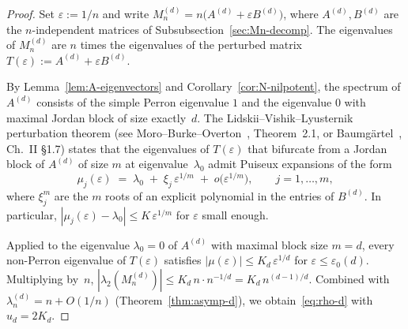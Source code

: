 \documentclass{amsart}
\theoremstyle{definition}
\theoremstyle{remark}
\begin{document}
\begin{proof}
Set $\varepsilon := 1/n$ and write
$M_n^{(d)} = n\bigl(A^{(d)} + \varepsilon B^{(d)}\bigr)$, where
$A^{(d)}, B^{(d)}$ are the $n$-independent matrices of
Subsubsection~\ref{sec:Mn-decomp}.  The eigenvalues of $M_n^{(d)}$ are
$n$ times the eigenvalues of the perturbed matrix
$T(\varepsilon) := A^{(d)} + \varepsilon B^{(d)}$.

By Lemma~\ref{lem:A-eigenvectors} and
Corollary~\ref{cor:N-nilpotent}, the spectrum of $A^{(d)}$
consists of the simple Perron eigenvalue $1$ and the eigenvalue
$0$ with maximal Jordan block of size exactly~$d$.  The
Lidskii--Vishik--Lyusternik perturbation theorem
(see Moro--Burke--Overton~\cite{moro-burke-overton-1997},
Theorem~2.1, or Baumg\"artel~\cite{baumgartel}, Ch.~II
\S 1.7) states that the eigenvalues of $T(\varepsilon)$ that
bifurcate from a Jordan block of $A^{(d)}$ of size $m$ at
eigenvalue~$\lambda_0$ admit Puiseux expansions of the form
\[
  \mu_j(\varepsilon) \;=\; \lambda_0 \;+\; \xi_j\,
    \varepsilon^{1/m} \;+\; o\bigl(\varepsilon^{1/m}\bigr),
  \qquad j = 1, \ldots, m,
\]
where $\xi_j^{m}$ are the $m$ roots of an explicit polynomial in
the entries of $B^{(d)}$.  In particular,
$|\mu_j(\varepsilon) - \lambda_0| \le K\, \varepsilon^{1/m}$
for $\varepsilon$ small enough.

Applied to the eigenvalue $\lambda_0 = 0$ of $A^{(d)}$ with
maximal block size $m = d$, every non-Perron eigenvalue of
$T(\varepsilon)$ satisfies
$|\mu(\varepsilon)| \le K_d\, \varepsilon^{1/d}$ for
$\varepsilon \le \varepsilon_0(d)$.  Multiplying by~$n$,
$|\lambda_2(M_n^{(d)})| \le K_d\, n \cdot n^{-1/d}
= K_d\, n^{(d-1)/d}$.  Combined with
$\lambda_n^{(d)} = n + O(1/n)$ (Theorem~\ref{thm:asymp-d}), we
obtain~\eqref{eq:rho-d} with $u_d = 2 K_d$.
\end{proof}
\end{document}
